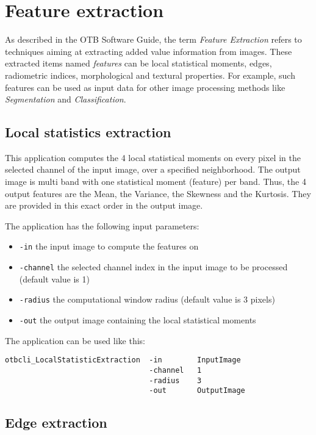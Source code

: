 \section{Feature extraction}\label{sec:featextract}

As described in the OTB Software Guide, the term {\em Feature Extraction} refers to
techniques aiming at extracting added value information from images. These
extracted items named {\em features} can be local statistical moments, edges,
radiometric indices, morphological and textural properties. For example, such
features can be used as input data for other image processing methods like
{\em Segmentation} and {\em Classification}.

\subsection{Local statistics extraction}\label{ssec:localstatextraction}

This application computes the 4 local statistical moments on every pixel in the
selected channel of the input image, over a specified neighborhood. The output
image is multi band with one statistical moment (feature) per band. Thus, the 4
output features are the Mean, the Variance, the Skewness and the Kurtosis. They are
provided in this exact order in the output image.


The  application has the following input parameters:
\begin{itemize}
\item \verb?-in? the input image to compute the features on
\item \verb?-channel? the selected channel index in the input image to be processed (default value is 1)
\item \verb?-radius? the computational window radius (default value is 3 pixels)
\item \verb?-out? the output image containing the local statistical moments
\end{itemize}


The application can be used like this:
\begin{verbatim}
otbcli_LocalStatisticExtraction  -in        InputImage
                                 -channel   1
                                 -radius    3
                                 -out       OutputImage
\end{verbatim}



\subsection{Edge extraction}\label{ssec:edgeextraction}

